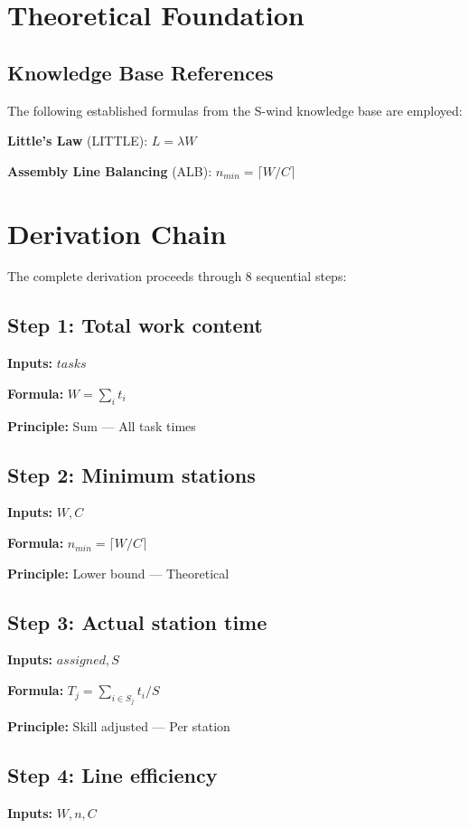 \documentclass[11pt,twocolumn]{article}
\begin{document}
\section{Theoretical Foundation}

\subsection{Knowledge Base References}
The following established formulas from the S-wind knowledge base are employed:

\textbf{Little's Law} (LITTLE): $L = \lambda W$ \cite{Little}

\textbf{Assembly Line Balancing} (ALB): $n_{min} = \lceil W/C \rceil$ \cite{Salveson}


\section{Derivation Chain}

The complete derivation proceeds through 8 sequential steps:

\subsection*{Step 1: Total work content}
\textbf{Inputs:} $tasks$

\textbf{Formula:} $W = \sum_i t_i$

\textbf{Principle:} Sum --- All task times

\subsection*{Step 2: Minimum stations}
\textbf{Inputs:} $W, C$

\textbf{Formula:} $n_{min} = \lceil W/C \rceil$

\textbf{Principle:} Lower bound --- Theoretical

\subsection*{Step 3: Actual station time}
\textbf{Inputs:} $assigned, S$

\textbf{Formula:} $T_j = \sum_{i \in S_j} t_i / S$

\textbf{Principle:} Skill adjusted --- Per station

\subsection*{Step 4: Line efficiency}
\textbf{Inputs:} $W, n, C$
\end{document}

